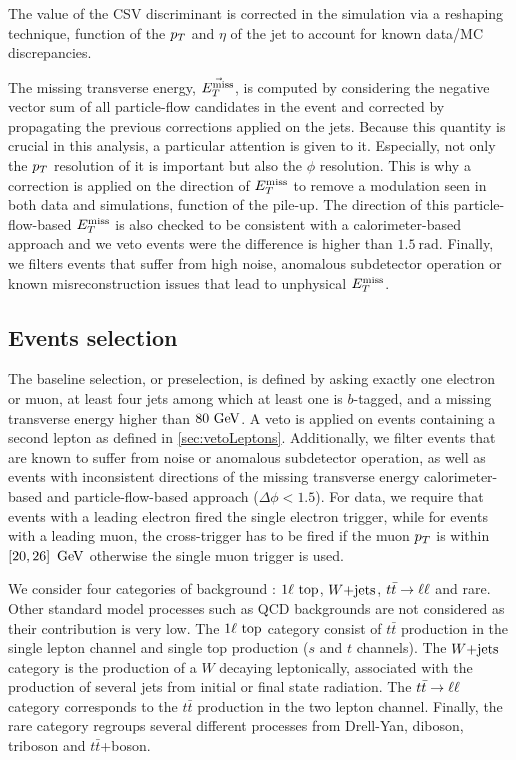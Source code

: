        The value of the CSV discriminant is corrected in the simulation via a reshaping technique, function of the 
       $p_T$ and $\eta$ of the jet to account for known data/MC discrepancies.

       The missing transverse energy, $\vec{E_T^\text{miss}}$, is computed by considering the 
       negative vector sum of all particle-flow candidates in the event and corrected by
       propagating the previous corrections applied on the jets. Because this quantity is
       crucial in this analysis, a particular attention is given to it. Especially, not only
       the $p_T$ resolution of it is important but also the $\phi$ resolution. This is why
       a correction is applied on the direction of $E_T^\text{miss}$ to remove a modulation seen in 
       both data and simulations, function of the pile-up. The direction of this 
       particle-flow-based $E_T^\text{miss}$ is also checked to be consistent with a calorimeter-based
       approach and we veto events were the difference is higher than $1.5~\text{rad}$.
       Finally, we filters events that suffer from high noise, anomalous subdetector operation
       or known misreconstruction issues that lead to unphysical $E_T^\text{miss}$.

        \subsection{Events selection}

        The baseline selection, or preselection, is defined by asking exactly one electron or muon, at least 
        four jets among which at least one is $b$-tagged, and a missing transverse energy higher than $80 ~\text{GeV}$.
        A veto is applied on events containing a second lepton as defined in \ref{sec:vetoLeptons}. Additionally,
        we filter events that are known to suffer from noise or anomalous subdetector operation, as well as events
        with inconsistent directions of the missing transverse energy calorimeter-based and particle-flow-based
        approach ($\Delta \phi < 1.5$). For data, we require that events with a leading electron fired the single
        electron trigger, while for events with a leading muon, the cross-trigger has to be fired if the muon $p_T$
        is within $\left[ 20, 26 \right] ~\text{GeV}$ otherwise the single muon trigger is used.

        We consider four categories of background : $1\ell~\text{top}$, $\text{$W$+jets}$, $t\bar{t} \rightarrow \ell \ell$ and rare. Other standard
        model processes such as QCD backgrounds are not considered as their contribution is very low. The $1\ell~\text{top}$
        category consist of $t\bar{t}$ production in the single lepton channel and single top production ($s$ and $t$ channels).
        The $\text{$W$+jets}$ category is the production of a $W$ decaying leptonically, associated with the production of several
        jets from initial or final state radiation. The $t\bar{t} \rightarrow \ell \ell$ category corresponds to the $t\bar{t}$ production
        in the two lepton channel. Finally, the rare category regroups several different processes from Drell-Yan, diboson,
        triboson and $t\bar{t}$+boson.

